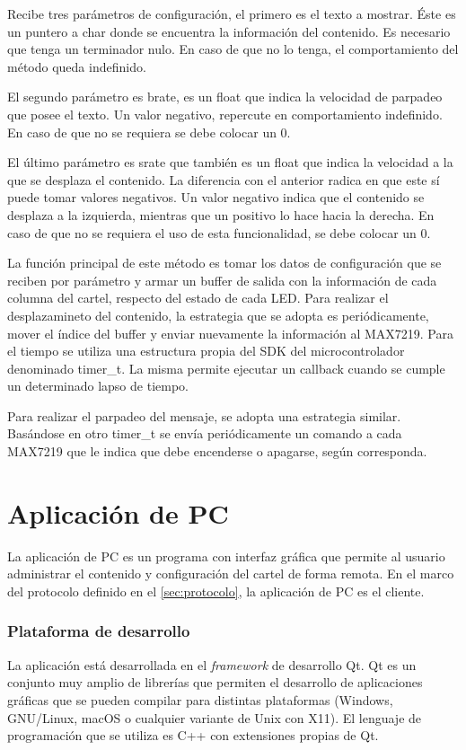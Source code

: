 Recibe tres parámetros de configuración, el primero es el texto a mostrar.
Éste es un puntero a char donde se encuentra la información del contenido.
Es necesario que tenga un terminador nulo.
En caso de que no lo tenga, el comportamiento del método queda indefinido.

El segundo parámetro es brate, es un float que indica la velocidad de parpadeo que posee el texto.
Un valor negativo, repercute en comportamiento indefinido.
En caso de que no se requiera se debe colocar un 0.

El último parámetro es srate que también es un float que indica la velocidad a la que se desplaza el contenido.
La diferencia con el anterior radica en que este sí puede tomar valores negativos.
Un valor negativo indica que el contenido se desplaza a la izquierda, mientras que un positivo lo hace hacia la derecha.
En caso de que no se requiera el uso de esta funcionalidad, se debe colocar un 0. 

La función principal de este método es tomar los datos de configuración que se reciben por parámetro y armar un buffer de salida con la información de cada columna del cartel, respecto del estado de cada LED.
Para realizar el desplazamineto del contenido, la estrategia que se adopta es periódicamente, mover el índice del buffer y enviar nuevamente la información al MAX7219.
Para el tiempo se utiliza una estructura propia del SDK del microcontrolador denominado timer\_t.
La misma permite ejecutar un callback cuando se cumple un determinado lapso de tiempo.

Para realizar el parpadeo del mensaje, se adopta una estrategia similar.
Basándose en otro timer\_t se envía periódicamente un comando a cada MAX7219 que le indica que debe encenderse o apagarse, según corresponda.

\section{Aplicación de PC}\label{sec:pc}
La aplicación de PC es un programa con interfaz gráfica que permite al usuario administrar el contenido y configuración del cartel de forma remota. En el marco del protocolo definido en el \ref{sec:protocolo}, la aplicación de PC es el cliente.

\subsubsection{Plataforma de desarrollo}
La aplicación está desarrollada en el \emph{framework} de desarrollo Qt. Qt es un conjunto muy amplio de librerías que permiten el desarrollo de aplicaciones gráficas que se pueden compilar para distintas plataformas (Windows, GNU/Linux, macOS o cualquier variante de Unix con X11). El lenguaje de programación que se utiliza es C++ con extensiones propias de Qt.

